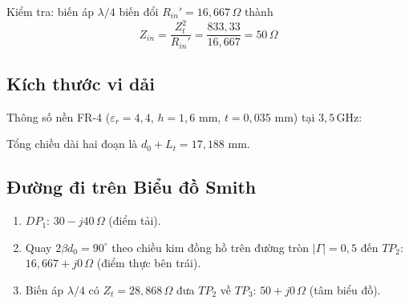 \documentclass[a4paper]{report}
\newcommand\GHz{\,\mathrm{GHz}}
\begin{document}
Kiểm tra: biến áp $\lambda/4$ biến đổi $R_{in}'=16{,}667\,\Omega$ thành
\begin{equation}
  Z_{in}=\frac{Z_t^2}{R_{in}'}=\frac{833{,}33}{16{,}667}=50\,\Omega
\end{equation}

\subsection{Kích thước vi dải}
Thông số nền FR-4 ($\varepsilon_r=4{,}4$, $h=1{,}6$ mm, $t=0{,}035$ mm) tại $3{,}5\GHz$:

\begin{table}[H]
\caption{Thông số đường truyền vi dải của mạng biến áp $\lambda/4$ (theo lý thuyết)}
\centering\footnotesize\setlength\tabcolsep{2.5pt}
\end{table}

Tổng chiều dài hai đoạn là $d_0+L_t=17{,}188$ mm.

\subsection{Đường đi trên Biểu đồ Smith}
\begin{enumerate}
  \item $DP_1$: $30-j40\,\Omega$ (điểm tải).
  \item Quay $2\beta d_0=90^\circ$ theo chiều kim đồng hồ trên đường tròn $|\Gamma|=0{,}5$ đến $TP_2$: $16{,}667+j0\,\Omega$ (điểm thực bên trái).
  \item Biến áp $\lambda/4$ có $Z_t=28{,}868\,\Omega$ đưa $TP_2$ về $TP_3$: $50+j0\,\Omega$ (tâm biểu đồ).
\end{enumerate}
\end{document}
